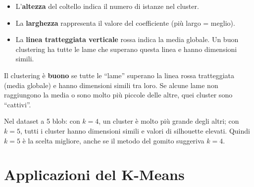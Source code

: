 \begin{itemize}
    \item L'\textbf{altezza} del coltello indica il numero di istanze nel cluster.
    \item La \textbf{larghezza} rappresenta il valore del coefficiente (più largo = meglio).
    \item La \textbf{linea tratteggiata verticale} rossa indica la media globale. Un buon clustering ha tutte le lame che superano questa linea e hanno dimensioni simili.
\end{itemize}

\begin{center}
\end{center}

\begin{notebox}
Il clustering è \textbf{buono} se tutte le ``lame'' superano la linea rossa tratteggiata (media globale) e hanno dimensioni simili tra loro. Se alcune lame non raggiungono la media o sono molto più piccole delle altre, quei cluster sono ``cattivi''.

Nel dataset a 5 blob: con $k=4$, un cluster è molto più grande degli altri; con $k=5$, tutti i cluster hanno dimensioni simili e valori di silhouette elevati. Quindi $k=5$ è la scelta migliore, anche se il metodo del gomito suggeriva $k=4$.
\end{notebox}

\section{Applicazioni del K-Means}

